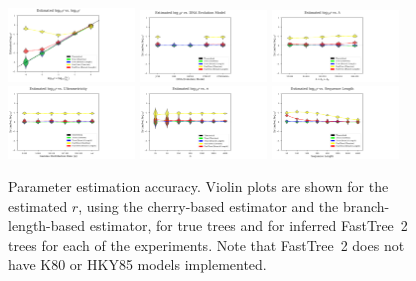 \begin{figure} %
\centering
\includegraphics[width=0.3\textwidth]{figs/dualbirth-res-cherry-supp-a}
\includegraphics[width=0.3\textwidth]{figs/dualbirth-res-cherry-supp-b}
\includegraphics[width=0.3\textwidth]{figs/dualbirth-res-cherry-supp-c}\\
\includegraphics[width=0.3\textwidth]{figs/dualbirth-res-cherry-supp-d}
\includegraphics[width=0.3\textwidth]{figs/dualbirth-res-cherry-supp-e}
\includegraphics[width=0.3\textwidth]{figs/dualbirth-res-cherry-supp-f}
\caption[Parameter estimation accuracy]
{Parameter estimation accuracy. Violin plots are shown for the estimated $r$, using the cherry-based estimator and the branch-length-based estimator, for true trees and for inferred FastTree~2 trees for each of the experiments. Note that FastTree~2 does not have \gls{K80} or \gls{HKY85} models implemented.}
\label{fig:dualbirth-res-cherry-supp}
\end{figure}

